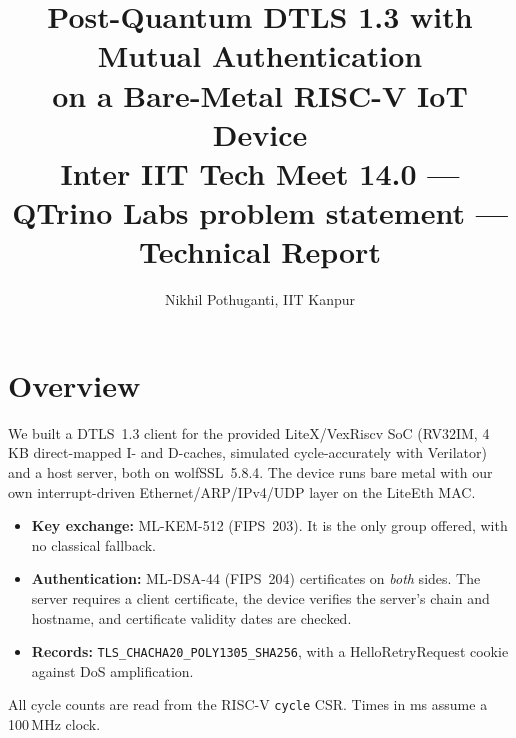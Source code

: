 \documentclass[10pt,a4paper]{article}
\title{\vspace{-0.6cm}\textbf{Post-Quantum DTLS 1.3 with Mutual Authentication\\on a Bare-Metal RISC-V IoT Device}\\[2pt]
\large Inter IIT Tech Meet 14.0 --- QTrino Labs problem statement --- Technical Report}
\author{Nikhil Pothuganti, IIT Kanpur}
\date{\vspace{-0.9cm}}
\begin{document}
\maketitle

\section{Overview}
We built a DTLS~1.3 client for the provided LiteX/VexRiscv SoC (RV32IM, 4\,KB direct-mapped I- and
D-caches, simulated cycle-accurately with Verilator) and a host server, both on wolfSSL~5.8.4.
The device runs bare metal with our own interrupt-driven Ethernet/ARP/IPv4/UDP layer on the LiteEth MAC.
\begin{itemize}
  \item \textbf{Key exchange:} ML-KEM-512 (FIPS~203). It is the only group offered, with no classical fallback.
  \item \textbf{Authentication:} ML-DSA-44 (FIPS~204) certificates on \emph{both} sides. The server requires a client
    certificate, the device verifies the server's chain and hostname, and certificate validity dates are checked.
  \item \textbf{Records:} \texttt{TLS\_CHACHA20\_POLY1305\_SHA256}, with a HelloRetryRequest cookie against DoS amplification.
\end{itemize}
All cycle counts are read from the RISC-V \texttt{cycle} CSR. Times in ms assume a 100\,MHz clock.
\end{document}
